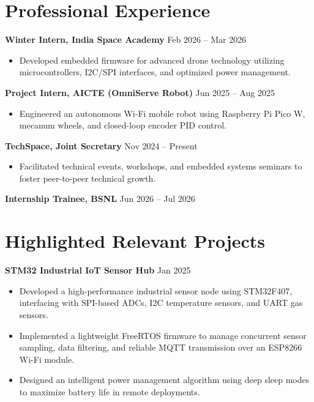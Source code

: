 \documentclass[10pt,a4paper]{article}%
\begin{document}
\section*{Professional Experience}%
\noindent \textbf{Winter Intern, India Space Academy} \hfill Feb 2026 -- Mar 2026%
\begin{itemize}[leftmargin=15pt, nosep, topsep=0pt]%
\item Developed embedded firmware for advanced drone technology utilizing microcontrollers, I2C/SPI interfaces, and optimized power management.%
\end{itemize} \vspace{6pt}%

\noindent \textbf{Project Intern, AICTE (OmniServe Robot)} \hfill Jun 2025 -- Aug 2025%
\begin{itemize}[leftmargin=15pt, nosep, topsep=0pt]%
\item Engineered an autonomous Wi-Fi mobile robot using Raspberry Pi Pico W, mecanum wheels, and closed-loop encoder PID control.%
\end{itemize} \vspace{6pt}%

\noindent \textbf{TechSpace, Joint Secretary} \hfill Nov 2024 -- Present%
\begin{itemize}[leftmargin=15pt, nosep, topsep=0pt]%
\item Facilitated technical events, workshops, and embedded systems seminars to foster peer-to-peer technical growth.%
\end{itemize} \vspace{6pt}%

\noindent \textbf{Internship Trainee, BSNL} \hfill Jun 2026 -- Jul 2026 \vspace{6pt}%

\section*{Highlighted Relevant Projects}%
\noindent \textbf{STM32 Industrial IoT Sensor Hub} \hfill Jan 2025%
\begin{itemize}[leftmargin=15pt, nosep, topsep=0pt]%
\item Developed a high-performance industrial sensor node using STM32F407, interfacing with SPI-based ADCs, I2C temperature sensors, and UART gas sensors.%
\item Implemented a lightweight FreeRTOS firmware to manage concurrent sensor sampling, data filtering, and reliable MQTT transmission over an ESP8266 Wi-Fi module.%
\item Designed an intelligent power management algorithm using deep sleep modes to maximize battery life in remote deployments.%
\end{itemize} \vspace{8pt}
\end{document}

